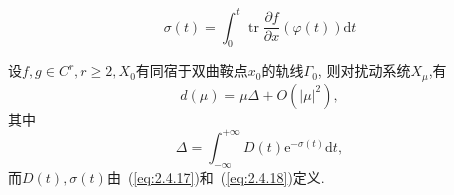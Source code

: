 \begin{equation}
  \label{eq:2.4.18}
  \sigma(t)=\int_{0}^{t} \operatorname{tr} \frac{\partial f}{\partial x}(\varphi(t)) \mathrm{d} t
\end{equation}
\begin{theorem}
  \label{thm:2.4.5}
  设$f,g\in C^r,r\geq 2,X_0$有同宿于双曲鞍点$x_0$的轨线$\Gamma_0$,
  则对扰动系统$X_{\mu}$,有
  \begin{equation}
    \label{eq:2.4.19}
    d(\mu)=\mu \Delta+O\left(|\mu|^{2}\right),
  \end{equation}
  其中
  \begin{equation}
    \label{eq:2.4.20}
    \Delta=\int_{-\infty}^{+\infty} D(t) \mathrm{e}^{-\sigma(t)} \mathrm{d} t,
  \end{equation}
  而$D(t),\sigma(t)$由~(\ref{eq:2.4.17})和~(\ref{eq:2.4.18})定义.
\end{theorem}

